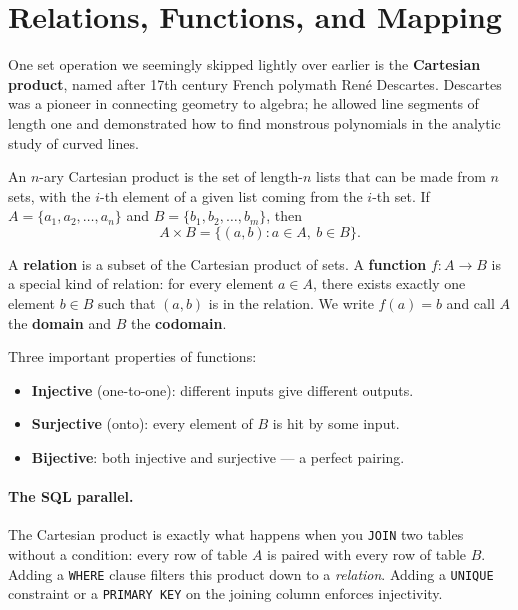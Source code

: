 \section{Relations, Functions, and Mapping}

One set operation we seemingly skipped lightly over earlier is the
\textbf{Cartesian product}, named after 17th century French polymath
Ren\'{e} Descartes. Descartes was a pioneer in connecting geometry to algebra;
he allowed line segments of length one and demonstrated how to find monstrous
polynomials in the analytic study of curved lines.

An $n$-ary Cartesian product is the set of length-$n$ lists that can be made
from $n$ sets, with the $i$-th element of a given list coming from the $i$-th
set. If $A = \{a_1, a_2, \ldots, a_n\}$ and $B = \{b_1, b_2, \ldots, b_m\}$,
then
\[
    A \times B = \{(a, b) : a \in A,\ b \in B\}.
\]

A \textbf{relation} is a subset of the Cartesian product of sets. A
\textbf{function} $f : A \to B$ is a special kind of relation: for every
element $a \in A$, there exists exactly one element $b \in B$ such that
$(a, b)$ is in the relation. We write $f(a) = b$ and call $A$ the
\textbf{domain} and $B$ the \textbf{codomain}.

Three important properties of functions:
\begin{itemize}[noitemsep]
    \item \textbf{Injective} (one-to-one): different inputs give different outputs.
    \item \textbf{Surjective} (onto): every element of $B$ is hit by some input.
    \item \textbf{Bijective}: both injective and surjective --- a perfect pairing.
\end{itemize}

\paragraph{The SQL parallel.}
The Cartesian product is exactly what happens when you \texttt{JOIN} two
tables without a condition: every row of table $A$ is paired with every row of
table $B$. Adding a \texttt{WHERE} clause filters this product down to a
\emph{relation}. Adding a \texttt{UNIQUE} constraint or a \texttt{PRIMARY KEY} on the joining column enforces injectivity.

